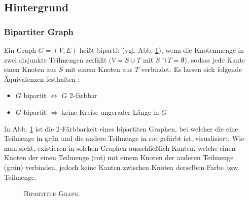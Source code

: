 \subsection{Hintergrund}

\subsubsection{Bipartiter Graph}
\label{sec:digression_bipartite_graph}

Ein Graph $G = (V, E)$ heißt bipartit (vgl. Abb. \ref{fig:digression_bipartite_graph}), wenn die Knotenmenge in zwei disjunkte Teilmengen zerfällt
$(V = S \cup T$ mit $S \cap T = \emptyset$), sodass jede Kante einen Knoten aus $S$ mit einem Knoten aus $T$ verbindet. \cite{HochschuleDarmstadt}\newline
Es lassen sich folgende Äquivalenzen festhalten \cite{Leighton2010}:
\begin{itemize}
  \item $G$ bipartit $\iff$ $G$ 2-färbbar
  \item $G$ bipartit $\iff$ keine Kreise ungerader Länge in $G$
\end{itemize}
In Abb. \ref{fig:digression_bipartite_graph} ist die 2-Färbbarkeit eines bipartiten Graphen, bei welcher die eine Teilmenge
in grün und die andere Teilmenge in rot gefärbt ist, visualisiert. Wie man sieht, existieren in solchen Graphen
ausschließlich Kanten, welche einen Knoten der einen Teilmenge (rot) mit einem Knoten der anderen Teilmenge (grün) verbinden,
jedoch keine Kanten zwischen Knoten derselben Farbe bzw. Teilmenge.

\begin{figure}[H]
\centering
{}
\caption{\textsc{Bipartiter Graph.}}
\label{fig:digression_bipartite_graph}
\end{figure}

